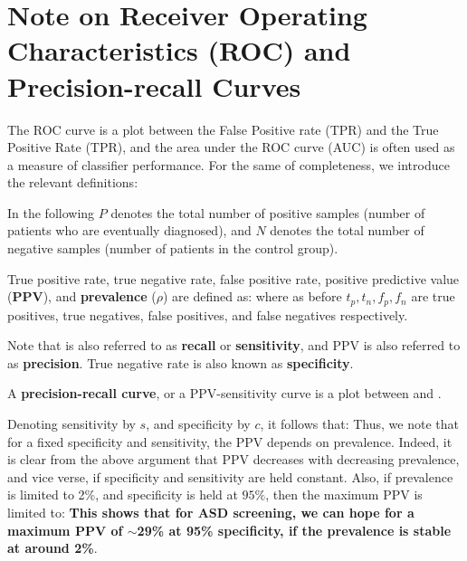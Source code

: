 \documentclass[onecolumn,,10pt]{IEEEtran}
\begin{document}
\section{Note on Receiver Operating Characteristics (ROC) and Precision-recall  Curves}\label{sec:ROC}

The ROC curve is a plot between the False Positive rate (TPR) and the True Positive Rate (TPR), and the area under the ROC curve (AUC) is often used as a measure of classifier performance. For the same of completeness, we introduce the relevant definitions:

In the following $P$ denotes the total number of positive samples (number of patients who are eventually diagnosed), and $N$ denotes the total number of negative  samples (number of patients in the control group).
\begin{defn}
  True positive rate, true negative rate, false positive rate,  positive predictive value (\textbf{PPV}), and \textbf{prevalence} ($\rho$) are defined as: 
  where as before $t_p,t_n,f_p,f_n$ are true positives, true negatives, false positives, and false negatives respectively. 
\end{defn}
%
Note that \TPR is also referred to as \textbf{recall} or \textbf{sensitivity}, and PPV is also referred to as \textbf{precision}. True negative rate is also known as \textbf{specificity}.

A \textbf{precision-recall curve}, or a PPV-sensitivity curve is a plot between \PPV and \TPR.

Denoting sensitivity by $s$, and specificity by $c$, it follows that:
%
Thus, we note that for a fixed specificity and sensitivity, the PPV depends on prevalence. Indeed, it is clear from the above argument that PPV decreases with decreasing prevalence, and vice verse, if specificity and sensitivity are held constant. Also, if prevalence is limited to 2\%, and specificity is held at $95\%$, then the maximum PPV is limited to:
%
\textbf{This shows that for ASD screening, we can hope for a maximum PPV of $\sim$29\% at 95\% specificity, if the prevalence is stable at around 2\%}.
\end{document}
